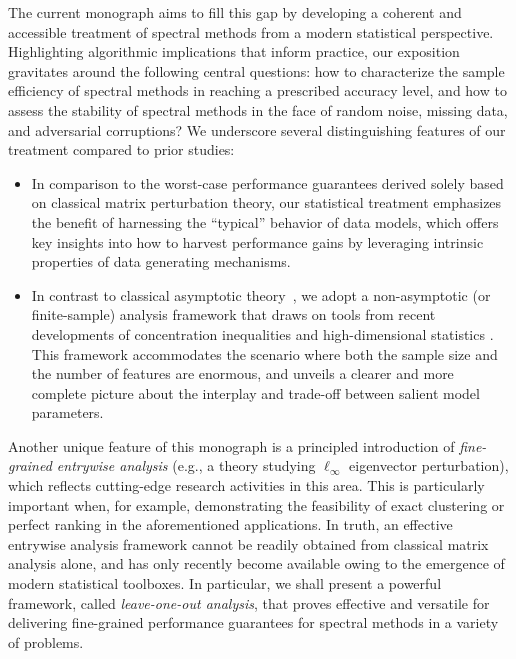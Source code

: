The current monograph aims to fill this gap by developing a coherent and accessible treatment of spectral methods from
a modern statistical perspective. Highlighting  algorithmic implications that inform practice,
our exposition gravitates around the following central questions:
how to characterize the sample efficiency of spectral methods in reaching a prescribed accuracy level,
and how to assess the stability of spectral methods in the face of random noise, missing data, and adversarial corruptions?
We underscore several distinguishing features of our treatment compared to prior studies:
%
\begin{itemize}
	\item In comparison to the worst-case performance guarantees derived solely based on classical matrix perturbation theory,
our statistical treatment emphasizes the benefit of harnessing the ``typical'' behavior of data models,
which offers key insights into how to harvest performance gains by leveraging intrinsic properties of data generating mechanisms.

	\item In contrast to classical asymptotic theory~\citep{van2000asymptotic},
		we adopt a non-asymptotic (or finite-sample) analysis framework that draws on tools from recent developments of concentration inequalities \citep{tropp2015introduction} and high-dimensional statistics \citep{wainwright2019high}. This framework accommodates the scenario where both the sample size and the number of features are enormous,
and unveils a clearer and more complete picture about the interplay and trade-off between salient model parameters.

\end{itemize}






Another unique feature of this monograph is a principled introduction of {\em fine-grained entrywise analysis} (e.g., a theory studying $\ell_{\infty}$ eigenvector perturbation),
which reflects cutting-edge research activities in this area.
This is particularly important when, for example, demonstrating the feasibility of exact clustering or perfect ranking in the aforementioned applications.
In truth, an effective entrywise analysis framework cannot be  readily obtained from classical matrix analysis alone,
and has only recently become available owing to the emergence of modern statistical toolboxes. In particular, we shall present
a powerful framework, called {\em leave-one-out analysis}, that proves effective and versatile for delivering fine-grained performance guarantees for spectral methods in a variety of problems.





